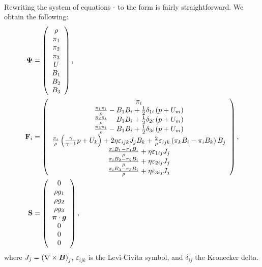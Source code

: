 \paragraph{}
Rewriting the system of equations  -  to the form  is fairly straightforward.
We obtain the following:
\begin{align}
\mathrm{\mathbf{\Psi}} & =  \left(\begin{array}{c}\rho \\ \pi_1 \\ \pi_2 \\ \pi_3 \\ U \\ B_1 \\ B_2 \\ B_3 \\ \end{array}\right),\\\mathrm{\mathbf{F}}_i & =  \left(\begin{array}{c} \pi_i \\ \frac{\pi_1 \pi_i}{\rho} - B_1 B_i + \frac12 \delta_{1i} \left( p + U_m\right) \\ \frac{\pi_2 \pi_i}{\rho} - B_1 B_i + \frac12 \delta_{2i} \left( p + U_m\right) \\ \frac{\pi_3 \pi_i}{\rho} - B_1 B_i + \frac12 \delta_{3i} \left( p + U_m\right) \\ \frac{\pi_i}{\rho} \left( \frac{\gamma}{\gamma - 1} p + U_k\right) + 2\eta\varepsilon_{ijk} J_j B_k + \frac{2}{\rho} \varepsilon_{ijk} \left( \pi_k B_i - \pi_i B_k\right) B_j  \\ \frac{\pi_i B_1 - \pi_1 B_i}{\rho} + \eta \varepsilon_{1ij} J_j \\ \frac{\pi_i B_2 - \pi_2 B_i}{\rho} + \eta \varepsilon_{2ij} J_j \\ \frac{\pi_i B_3 - \pi_3 B_i}{\rho} + \eta \varepsilon_{3ij} J_j \\ \end{array}\right),\\
\mathrm{\mathbf{S}} & =  \left(\begin{array}{c}0 \\ \rho g_1 \\ \rho g_2 \\ \rho g_3 \\ \mbox{\boldmath $\pi$} \cdot \mbox{\boldmath $g$} \\ 0 \\ 0 \\ 0 \\ \end{array}\right),
\end{align}
where $J_j = \left(\nabla\times\mbox{\boldmath $B$}\right)_j$, $\varepsilon_{ijk}$ is the Levi-Civita symbol, and $\delta_{ij}$ the Kronecker delta.
